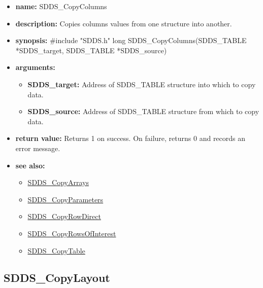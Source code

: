 \documentclass[11pt]{article}
\newcommand{\progref}[1]{\hyperref{SDDS_#1}{{\tt SDDS\_#1} (}{)}{SDDS_#1}}
\begin{document}
\begin{itemize}
\item {\bf name:}\newline
SDDS\_CopyColumns
\item {\bf description:}\newline
Copies columns values from one structure into another.
\item {\bf synopsis:} \#include "SDDS.h"\newline
long SDDS\_CopyColumns(SDDS\_TABLE *SDDS\_target, SDDS\_TABLE *SDDS\_source)
\item {\bf arguments:}
\begin{itemize}
\item {\bf SDDS\_target:} Address of SDDS\_TABLE structure into which to copy data.
\item {\bf SDDS\_source:} Address of SDDS\_TABLE structure from which to copy data.
\end{itemize}
\item {\bf return value:}\newline
Returns 1 on success. On failure, returns 0 and records an error message.
\item {\bf see also:}
\begin{itemize}
\item \progref{CopyArrays}
\item \progref{CopyParameters}
\item \progref{CopyRowDirect}
\item \progref{CopyRowsOfInterest}
\item \progref{CopyTable}
\end{itemize}
\end{itemize}

\subsection{SDDS\_CopyLayout}
\label{SDDS_CopyLayout}
\end{document}
